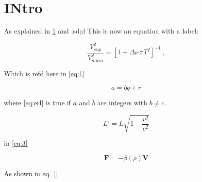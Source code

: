 \section{INtro}\label{sec:1}

As explained in \ref{sec:1} and ;sd;d
This is now an equation with a label:

\begin{equation}
\label{eq:1}
\frac{V_{ sup}^2}{V_{ norm}^2} = [1 + \Delta \nu \, \tau \, T^2 ]^{-1} \, ,
\end{equation}

Which is refd here in \ref{eq:1}

\begin{equation} \label{eq:erl}
a = bq + r
\end{equation}

where \eqref{eq:erl} is true if $a$ and $b$ are integers with $b \neq c$.

\begin{equation}
\label{eq:3}
  L' = {L}{\sqrt{1-\frac{v^2}{c^2}}}
 \end{equation}

in \ref{eq:3}

\begin{equation}
\mathbf{F} = -\beta(\rho) \mathbf{V}
\label{eq:linearbeta}
\end{equation}

As shown in eq. \ref{}


